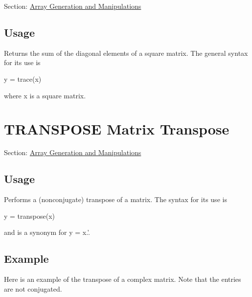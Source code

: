 Section\-: \hyperlink{sec_array}{Array Generation and Manipulations} \hypertarget{vtkwidgets_vtkxyplotwidget_Usage}{}\subsection{Usage}\label{vtkwidgets_vtkxyplotwidget_Usage}
Returns the sum of the diagonal elements of a square matrix. The general syntax for its use is \begin{DoxyVerb}   y = trace(x)
\end{DoxyVerb}
 where x is a square matrix. \hypertarget{array_transpose}{}\section{T\-R\-A\-N\-S\-P\-O\-S\-E Matrix Transpose}\label{array_transpose}
Section\-: \hyperlink{sec_array}{Array Generation and Manipulations} \hypertarget{vtkwidgets_vtkxyplotwidget_Usage}{}\subsection{Usage}\label{vtkwidgets_vtkxyplotwidget_Usage}
Performs a (nonconjugate) transpose of a matrix. The syntax for its use is \begin{DoxyVerb}    y = transpose(x)
\end{DoxyVerb}
 and is a synonym for {\ttfamily y = x.'}. \hypertarget{variables_struct_Example}{}\subsection{Example}\label{variables_struct_Example}
Here is an example of the transpose of a complex matrix. Note that the entries are not conjugated.


